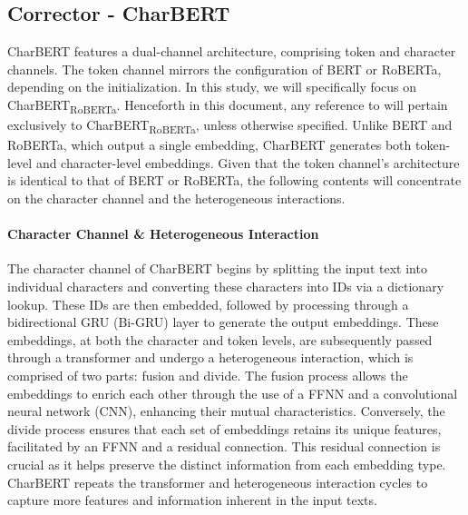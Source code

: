\subsection{Corrector - CharBERT}
\label{subsec:3_corrector_charbert}
CharBERT features a dual-channel architecture, comprising token and character channels. The token channel mirrors the configuration of BERT or RoBERTa, depending on the initialization. In this study, we will specifically focus on CharBERT\textsubscript{RoBERTa}. Henceforth in this document, any reference to  will pertain exclusively to CharBERT\textsubscript{RoBERTa}, unless otherwise specified. Unlike BERT and RoBERTa, which output a single embedding, CharBERT generates both token-level and character-level embeddings. Given that the token channel's architecture is identical to that of BERT or RoBERTa, the following contents will concentrate on the character channel and the heterogeneous interactions.

\paragraph*{Character Channel \& Heterogeneous Interaction}
\label{par:3_character_channel_heterogeneous_interaction}
The character channel of CharBERT begins by splitting the input text into individual characters and converting these characters into IDs via a dictionary lookup. These IDs are then embedded, followed by processing through a bidirectional GRU (Bi-GRU) layer to generate the output embeddings. These embeddings, at both the character and token levels, are subsequently passed through a transformer and undergo a heterogeneous interaction, which is comprised of two parts: fusion and divide. The fusion process allows the embeddings to enrich each other through the use of a FFNN and a convolutional neural network (CNN), enhancing their mutual characteristics. Conversely, the divide process ensures that each set of embeddings retains its unique features, facilitated by an FFNN and a residual connection. This residual connection is crucial as it helps preserve the distinct information from each embedding type. CharBERT repeats the transformer and heterogeneous interaction cycles to capture more features and information inherent in the input texts.

